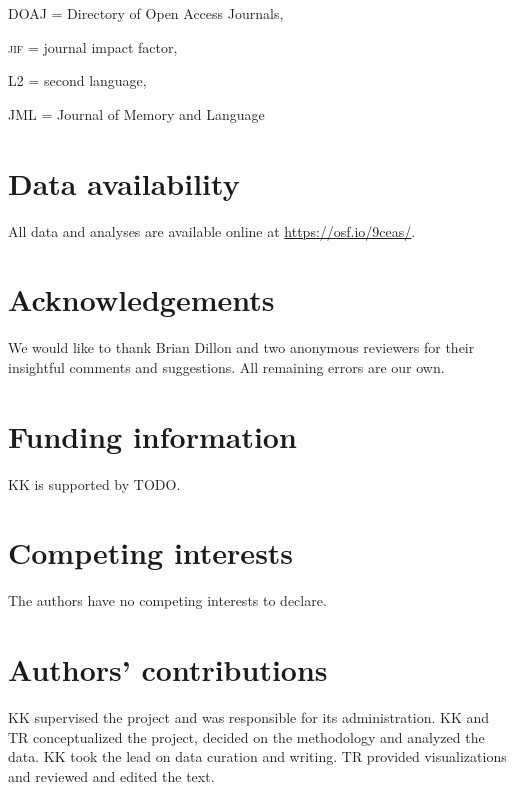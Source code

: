 \documentclass[cm,linguex]{glossa}
\begin{document}
\textsc{DOAJ} = Directory of Open Access Journals,

\textsc{jif} = journal impact factor,

\textsc{L2} = second language,

\textsc{JML} = Journal of Memory and Language

\hypertarget{data-availabilitysupplementary-files-optional}{%
\section*{Data availability}\label{data-availabilitysupplementary-files-optional}}

All data and analyses are available online at \url{https://osf.io/9ceas/}.

\hypertarget{acknowledgements-optional}{%
\section*{Acknowledgements}\label{acknowledgements-optional}}

We would like to thank Brian Dillon and two anonymous reviewers for their insightful comments and suggestions. All remaining errors are our own.

\hypertarget{funding-information-optional}{%
\section*{Funding information}\label{funding-information-optional}}

KK is supported by TODO.

\hypertarget{competing-interests-mandatory}{%
\section*{Competing interests}\label{competing-interests-mandatory}}

The authors have no competing interests to declare.

\hypertarget{contrib}{%
\section*{Authors' contributions}\label{contrib}}

KK supervised the project and was responsible for its administration. KK and TR conceptualized the project, decided on the methodology and analyzed the data. KK took the lead on data curation and writing. TR provided visualizations and reviewed and edited the text.


\end{document}
